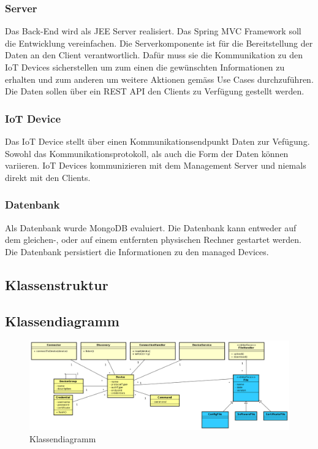 \subsubsection{Server}
Das Back-End wird als JEE Server realisiert. Das Spring MVC Framework soll die Entwicklung vereinfachen. Die Serverkomponente ist für die Bereitstellung der Daten an den Client verantwortlich. Dafür muss sie die Kommunikation zu den IoT Devices sicherstellen um zum einen die gewünschten Informationen zu erhalten und zum anderen um weitere Aktionen gemäss Use Cases durchzuführen. Die Daten sollen über ein REST API den Clients zu Verfügung gestellt werden.
\subsubsection{IoT Device}
Das IoT Device stellt über einen Kommunikationsendpunkt Daten zur Vefügung. Sowohl das Kommunikationsprotokoll, als auch die Form der Daten können variieren. IoT Devices kommunizieren mit dem Management Server und niemals direkt mit den Clients.
\subsubsection{Datenbank}
Als Datenbank wurde MongoDB evaluiert. Die Datenbank kann entweder auf dem gleichen-, oder auf einem entfernten physischen Rechner gestartet werden. Die Datenbank persistiert die Informationen zu den managed Devices.
\newpage


\begin{landscape}
\section{Klassenstruktur}
\subsection{Klassendiagramm}
\begin{figure}[H]
\centering
\includegraphics[width=1\textwidth]{../03_Design/images/domainmodel.png}
\caption{Klassendiagramm}
\end{figure}
\end{landscape}
